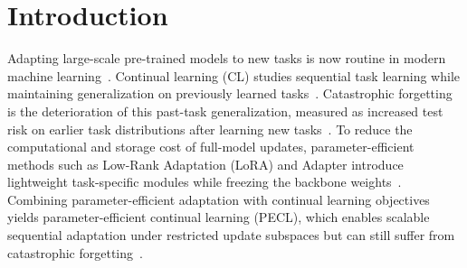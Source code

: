 \documentclass{article}
\theoremstyle{plain}
\theoremstyle{definition}
\theoremstyle{remark}
\begin{document}
\begin{abstract}
\end{abstract}


\section{Introduction}

Adapting large-scale pre-trained models to new tasks is now routine in modern machine learning~\cite{HAN2021225,bommasani2022opportunitiesrisksfoundationmodels}.
Continual learning (CL) studies sequential task learning while maintaining generalization on previously learned tasks~\cite{wangComprehensiveSurveyContinual2024,yangRecentAdvancesFoundation2024,shiContinualLearningLarge2024,zhouContinualLearningPreTrained2024}. Catastrophic forgetting is the deterioration of this past-task generalization, measured as increased test risk on earlier task distributions after learning new tasks~\cite{pmlr-v202-lin23f}.
To reduce the computational and storage cost of full-model updates, parameter-efficient methods such as Low-Rank Adaptation (LoRA)\cite{hu2022lora} and Adapter\cite{pmlr-v97-houlsby19a} introduce lightweight task-specific modules while freezing the backbone weights~\cite{dingParameterefficientFinetuningLargescale2023,He_2025_CVPR,NEURIPS2024_b0bc711f,hanParameterEfficientFineTuningLarge2024}. Combining parameter-efficient adaptation with continual learning objectives yields parameter-efficient continual learning (PECL), which enables scalable sequential adaptation under restricted update subspaces but can still suffer from catastrophic forgetting~\cite{gaoUnifiedContinualLearning2023,qiaoLearnMoreBother2024}.
\end{document}
